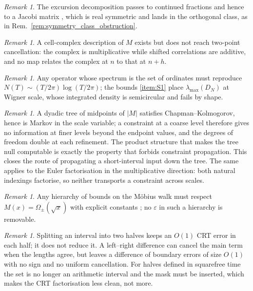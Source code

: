 \documentclass[11pt]{amsart}
\numberwithin{equation}{section}
\theoremstyle{plain}
\theoremstyle{definition}
\theoremstyle{remark}
\newtheorem{remark}[theorem]{Remark}
\begin{document}
\begin{remark}
\label{rem:negative_result_jacobi}
The excursion decomposition passes to continued fractions and hence to a
Jacobi matrix \cite{Flajolet1980}, which is real symmetric and lands in
the orthogonal class, as in Rem.~\ref{rem:symmetry_class_obstruction}.
\end{remark}

\begin{remark}
\label{rem:negative_result_topology}
A cell-complex description of $M$ exists \cite{Bjorner2011} but does not
reach two-point cancellation: the complex is multiplicative while
shifted correlations are additive, and no map relates the complex at $n$
to that at $n+h$.
\end{remark}

\begin{remark}
\label{rem:negative_result_density_of_states}
Any operator whose spectrum is the set of ordinates must reproduce
$N(T)\sim(T/2\pi)\log(T/2\pi)$; the bounds \ref{item:S1} place
$\lambda_{\max}(D_N)$ at Wigner scale, whose integrated density is
semicircular and fails by shape.
\end{remark}

\begin{remark}
\label{rem:negative_result_markov_tree}
A dyadic tree of midpoints of $|M|$ satisfies Chapman--Kolmogorov, hence
is Markov in the scale variable; a constraint at a coarse level
therefore gives no information at finer levels beyond the endpoint
values, and the degrees of freedom double at each refinement. The
product structure that makes the tree null computable is exactly the
property that forbids constraint propagation. This closes the route of
propagating a short-interval input down the tree. The same applies to
the Euler factorisation in the multiplicative direction: both natural
indexings factorise, so neither transports a constraint across scales.
\end{remark}

\begin{remark}
\label{rem:negative_result_omega_lower_bound}
Any hierarchy of bounds on the M\"obius walk must respect
$M(x)=\Omega_\pm(\sqrt x)$ with explicit constants
\cite{OdlyzkoteRiele1985}; no $\varepsilon$ in such a hierarchy is
removable.
\end{remark}

\begin{remark}
\label{rem:negative_result_halves_crt}
Splitting an interval into two halves keeps an $O(1)$ CRT error in each
half; it does not reduce it. A left--right difference can cancel the main
term when the lengths agree, but leaves a difference of boundary errors
of size $O(1)$ with no sign and no uniform cancellation. For halves
defined in squarefree time the set is no longer an arithmetic interval
and the mask must be inserted, which makes the CRT factorisation less
clean, not more.
\end{remark}
\end{document}
